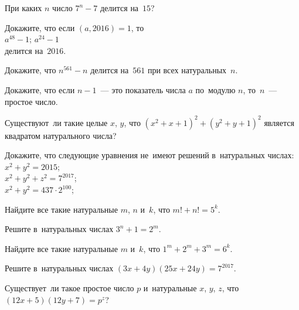 


\begin{problems}

\item
При каких $n$ число $7^{n} - 7$ делится на~$15$?

\item
Докажите, что если $(a, 2016) = 1$, то
\\
\subproblem $a^{48} - 1$;
\quad
\subproblem $a^{24} - 1$
\\
делится на~$2016$.

\item
Докажите, что $n^{561} - n$ делится на~$561$ при всех натуральных~$n$.

\item
Докажите, что если $n - 1$~--- это показатель числа $a$ по~модулю $n$,
то~$n$~--- простое число.

\item
Существуют~ли такие целые $x$, $y$, что $(x^2 + x + 1)^2 + (y^2 + y + 1)^2$
является квадратом натурального числа?

\item
Докажите, что следующие уравнения не~имеют решений в~натуральных числах:
\\
\subproblem $x^2 + y^2=2015$;
\\
\subproblem $x^2 + y^2 + z^2 = 7^{2017}$;
\\
\subproblem $x^2 + y^2 = 437 \cdot 2^{100}$;

\item
Найдите все такие натуральные $m$, $n$ и~$k$, что $m! + n! = 5^{k}$.

\item
Решите в~натуральных числах $3^{n} + 1 = 2^{m}$.

\item
Найдите все такие натуральные $m$ и~$k$, что $1^{m} + 2^{m} + 3^{m} = 6^{k}$.

\item
Решите в~натуральных числах $(3 x + 4 y) (25 x + 24 y) = 7^{2017}$.

\item
Существует~ли такое простое число $p$ и~натуральные $x$, $y$, $z$, что
$(12 x + 5) (12 y + 7) = p^{z}$?

\end{problems}

